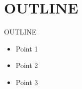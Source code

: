 \section{OUTLINE}
\begin{frame}{OUTLINE}
  \begin{itemize}
    \item Point 1
    \item Point 2
    \item Point 3
  \end{itemize}
\end{frame}